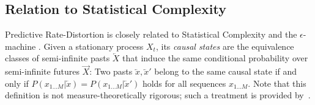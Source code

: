\documentclass[11pt,letterpaper]{article}
\begin{document}
%
%
%
%
%
%

\subsection{Relation to Statistical Complexity}\label{sec:complexity}

Predictive Rate-Distortion is closely related to Statistical Complexity and the $\epsilon$-machine \citep{crutchfield-inferring-1989}.
Given a stationary process $X_t$, its \emph{causal states} are the equivalence classes of semi-infinite pasts $\overleftarrow{X}$ that induce the same conditional probability over semi-infinite futures $\overrightarrow{X}$:
Two pasts $\overleftarrow{x}, \overleftarrow{x}'$ belong to the same causal state if and only if $P(x_{1...M}|\overleftarrow{x}) = P(x_{1...M}|\overleftarrow{x}')$ holds for all sequences $x_{1...M}$.
Note that this definition is not measure-theoretically rigorous; such a treatment is provided by~\citet{lohr-properties-2009}.
\end{document}
